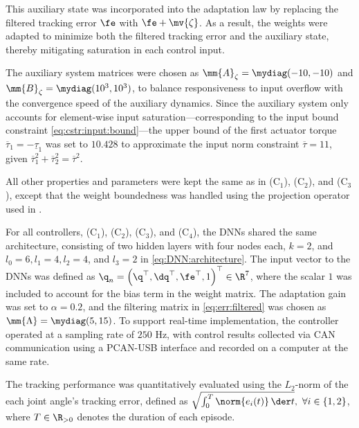 \documentclass[letterpaper, journal]{IEEEtran}
\begin{document}
This auxiliary state was incorporated into the adaptation law by replacing the filtered tracking error $\fe$ with $\fe+\mv{\zeta}$.
As a result, the weights were adapted to minimize both the filtered tracking error and the auxiliary state, thereby mitigating saturation in each control input.

The auxiliary system matrices were chosen as $\mm{A}_\zeta=\mydiag(-10,-10)$ and $\mm{B}_\zeta=\mydiag(10^3,10^3)$, 
to balance responsiveness to input overflow with the convergence speed of the auxiliary dynamics.
Since the auxiliary system only accounts for element-wise input saturation—corresponding to the input bound constraint \eqref{eq:cstr:input:bound}—the upper bound of the first actuator torque $\overline{\tau}_1=-\underline{\tau}_1$ was set to $10.428$ to approximate the input norm constraint $\overline{\tau} = 11$, given $\overline{\tau}_1^2 + \overline{\tau}_2^2 = \overline{\tau}^2$.

All other properties and parameters were kept the same as in (C$_1$), (C$_2$), and (C$_3$), except that the weight boundedness was handled using the projection operator used in \cite{Patil:2022aa}.

\hfill

For all controllers, \ie (C$_1$), (C$_2$), (C$_3$), and (C$_4$), the DNNs shared the same architecture, consisting of two hidden layers with four nodes each, \ie $k=2$, and $l_0=6, l_1=4, l_2=4$, and $l_3=2$ in \eqref{eq:DNN:architecture}.
The input vector to the DNNs was defined as ${\q}_n=\left(\q^\top,\dq^\top,\fe^\top,1\right)^\top\in\R^{7}$, where the scalar $1$ was included to account for the bias term in the weight matrix.
The adaptation gain was set to $\alpha = 0.2$, and the filtering matrix in \eqref{eq:err:filtered} was chosen as $\mm{\Lambda}=\mydiag(5,15)$.
To support real-time implementation, the controller operated at a sampling rate of $250$ Hz, with control results collected via CAN communication using a PCAN-USB interface and recorded on a computer at the same rate.

The tracking performance was quantitatively evaluated using the $L_2$-norm of the each joint angle's tracking error, defined as $\sqrt{\int_0^T\norm{e_i(t)}\,\der t},\ \forall i\in\{1,2\}$, where $T\in\R_{>0}$ denotes the duration of each episode.
\end{document}
